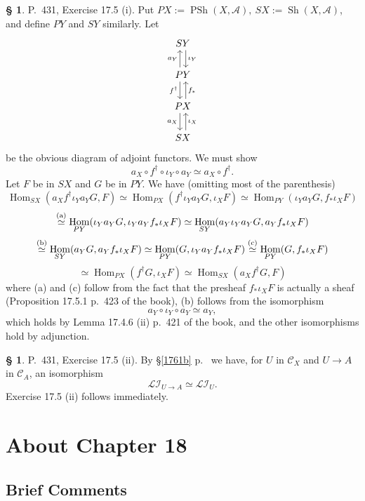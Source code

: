 \documentclass[12pt]{article}
\theoremstyle{remark}
\theoremstyle{definition}
\newtheorem{s}[thm]{\S}
\newcommand{\cc}{\mathcal}
\newcommand{\oo}{\operatorname}
\newcommand{\A}{\mathcal A}
\newcommand{\C}{\mathcal C}
\DeclareMathOperator{\Hom}{Hom}
\begin{document}
\begin{s}\label{175i}
P.~431, Exercise 17.5 (i). Put $PX:=\oo{PSh}(X,\A),\ SX:=\oo{Sh}(X,\A)$, and define $PY$ and $SY$ similarly. Let
$$
\begin{tikzcd} 
SY\ar[xshift=0.7ex]{d}{\iota_Y}\\ 
PY\ar[xshift=-0.7ex]{u}{a_Y}\ar[xshift=-0.7ex]{d}[swap]{f^\dagger}\\ 
PX\ar[xshift=0.7ex]{u}[swap]{f_*}\ar[xshift=-0.7ex]{d}[swap]{a_X}\\ 
SX\ar[xshift=0.7ex]{u}[swap]{\iota_X}
\end{tikzcd}
$$ 
be the obvious diagram of adjoint functors. We must show 
$$
a_X\circ f^\dagger\circ \iota_Y\circ a_Y\simeq a_X\circ f^\dagger. 
$$ 
Let $F$ be in $SX$ and $G$ be in $PY$. We have (omitting most of the parenthesis) 
$$
\Hom_{SX}(a_Xf^\dagger\iota_Ya_YG,F)\simeq
\Hom_{PX}(f^\dagger\iota_Ya_YG,\iota_XF)\simeq
\Hom_{PY}(\iota_Ya_YG,f_*\iota_XF)
$$
$$
\overset{(\text a)}{\simeq}
\Hom_{PY}(\iota_Ya_YG,\iota_Ya_Yf_*\iota_XF)\simeq
\Hom_{SY}(a_Y\iota_Ya_YG,a_Yf_*\iota_XF)
$$
$$
\overset{(\text b)}{\simeq}
\Hom_{SY}(a_YG,a_Yf_*\iota_XF)\simeq
\Hom_{PY}(G,\iota_Ya_Yf_*\iota_XF)\overset{(\text c)}{\simeq}
\Hom_{PY}(G,f_*\iota_XF)
$$ 
$$ 
\simeq 
\Hom_{PX}(f^\dagger G,\iota_XF)\simeq 
\Hom_{SX}(a_Xf^\dagger G,F)
$$ 
where (a) and (c) follow from the fact that the presheaf $f_*\iota_XF$ is actually a sheaf (Proposition 17.5.1 p.~423 of the book), (b) follows from the isomorphism 
$$
a_Y\circ \iota_Y\circ a_Y\simeq a_Y,
$$ 
which holds by Lemma 17.4.6 (ii) p.~421 of the book, and the other isomorphisms hold by adjunction. 
\end{s} 

%

\begin{s} 
P.~431, Exercise 17.5 (ii). By \S\ref{1761b} p.~\pageref{1761b} we have, for $U$ in $\C_X$ and $U\to A$ in $\C_A$, an isomorphism 
$$
\cc{LI}_{U\to A}\simeq\cc{LI}_U.
$$
Exercise 17.5 (ii) follows immediately. 
\end{s} 


\section{About Chapter 18} 

\subsection{Brief Comments}
\end{document}
